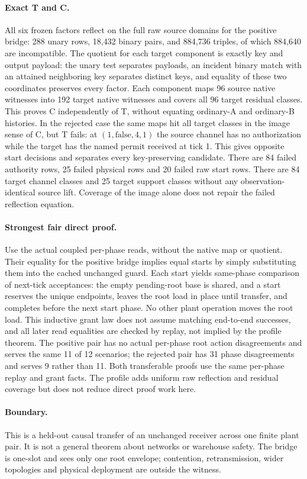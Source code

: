 \documentclass{article}
\begin{document}
\paragraph{Exact T and C.} All six frozen factors reflect on the full raw source domains for the positive bridge: 288 unary rows, 18,432 binary pairs, and 884,736 triples, of which 884,640 are incompatible. The quotient for each target component is exactly key and output payload: the unary test separates payloads, an incident binary match with an attained neighboring key separates distinct keys, and equality of these two coordinates preserves every factor. Each component maps 96 source native witnesses into 192 target native witnesses and covers all 96 target residual classes. This proves C independently of T, without equating ordinary-A and ordinary-B histories. In the rejected case the same maps hit all target classes in the image sense of C, but T fails: at $(1,\mathrm{false},4,1)$ the source channel has no authorization while the target has the named permit received at tick 1. This gives opposite start decisions and separates every key-preserving candidate. There are 84 failed authority rows, 25 failed physical rows and 20 failed raw start rows. There are 84 target channel classes and 25 target support classes without any observation-identical source lift. Coverage of the image alone does not repair the failed reflection equation.

\paragraph{Strongest fair direct proof.} Use the actual coupled per-phase reads, without the native map or quotient. Their equality for the positive bridge implies equal starts by simply substituting them into the cached unchanged guard. Each start yields same-phase comparison of next-tick acceptances: the empty pending-root base is shared, and a start reserves the unique endpoints, leaves the root load in place until transfer, and completes before the next start phase. No other plant operation moves the root load. This inductive grant law does not assume matching end-to-end successes, and all later read equalities are checked by replay, not implied by the profile theorem. The positive pair has no actual per-phase root action disagreements and serves the same 11 of 12 scenarios; the rejected pair has 31 phase disagreements and serves 9 rather than 11. Both transferable proofs use the same per-phase replay and grant facts. The profile adds uniform raw reflection and residual coverage but does not reduce direct proof work here.

\paragraph{Boundary.} This is a held-out causal transfer of an unchanged receiver across one finite plant pair. It is not a general theorem about networks or warehouse safety. The bridge is one-slot and sees only one root envelope; contention, retransmission, wider topologies and physical deployment are outside the witness.
\end{document}
